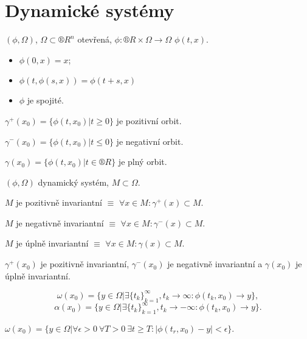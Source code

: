 \documentclass[12pt]{article}					%
\begin{document}

\section{Dynamické systémy}
\begin{definice}
	$(\phi, \Omega)$, $\Omega \subset ®R^n$ otevřená, $\phi: ®R \times \Omega \rightarrow \Omega$ $\phi(t, x)$.
	
	\begin{itemize}
		\item $\phi(0, x) = x$;
		\item $\phi(t, \phi(s, x)) = \phi(t + s, x)$
		\item $\phi$ je spojité.
	\end{itemize}
\end{definice}

\begin{definice}[Orbit]
	$\gamma^+(x_0) = \{\phi(t, x_0) | t ≥ 0\}$ je pozitivní orbit.

	$\gamma^-(x_0) = \{\phi(t, x_0) | t ≤ 0\}$ je negativní orbit.

	$\gamma(x_0) = \{\phi(t, x_0) | t \in ®R\}$ je plný orbit.
\end{definice}

\begin{definice}
	$(\phi, \Omega)$ dynamický systém, $M \subset \Omega$.

	$M$ je pozitivně invariantní $≡$ $\forall x \in M: \gamma^+(x) \subset M$.

	$M$ je negativně invariantní $≡$ $\forall x \in M: \gamma^-(x) \subset M$.

	$M$ je úplně invariantní $≡$ $\forall x \in M: \gamma(x) \subset M$.
\end{definice}

\begin{poznamka}
	$\gamma^+(x_0)$ je pozitivně invariantní, $\gamma^-(x_0)$ je negativně invariantní a $\gamma(x_0)$ je úplně invariantní.
\end{poznamka}

\begin{definice}
	$$ \omega(x_0) = \{y \in \Omega | \exists \{t_k\}_{k=1}^∞, t_k \rightarrow ∞: \phi(t_k, x_0) \rightarrow y\}, $$
	$$ \alpha(x_0) = \{y \in \Omega | \exists \{t_k\}_{k=1}^∞, t_k \rightarrow -∞: \phi(t_k, x_0) \rightarrow y\}. $$
\end{definice}

\begin{poznamka}[To je ekvivalentní]
	$\omega(x_0) = \{y \in \Omega | \forall \epsilon > 0\ \forall T > 0\ \exists t ≥ T: |\phi(t_r, x_0) - y| < \epsilon\}$.
\end{poznamka}
\end{document}
